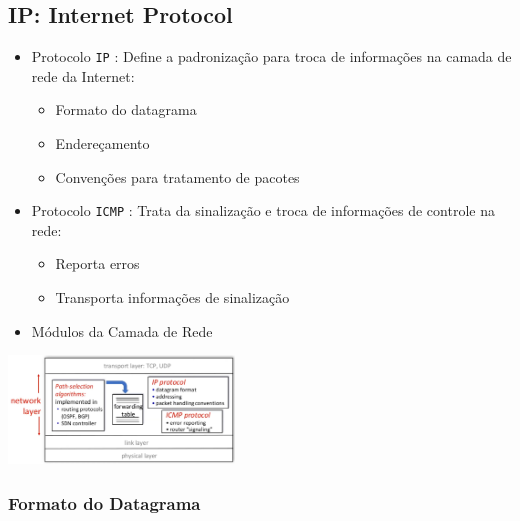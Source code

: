     \subsection{IP: Internet Protocol}
    
        \begin{itemize}[left=0.5cm, align=left, nosep]
            \item Protocolo \texttt{IP} : Define a padronização para troca de informações na camada de rede da Internet:
            \begin{itemize}[left=0.5cm, nosep, label=$\hookrightarrow$]
                \item Formato do datagrama
                \item Endereçamento
                \item Convenções para tratamento de pacotes
            \end{itemize}
            \item Protocolo \texttt{ICMP} : Trata da sinalização e troca de informações de controle na rede:
            \begin{itemize}[left=0.5cm, nosep, label=$\hookrightarrow$]
                \item Reporta erros
                \item Transporta informações de sinalização
            \end{itemize}
        \end{itemize}


        \begin{itemize}[left=0.5cm, align=left, nosep]
            \item Módulos da Camada de Rede
        \end{itemize}

        \begin{center}
            \includegraphics[width=0.45\textwidth]{img/cap-04/modulos-camada-de-rede.png}
        \end{center}

        \subsubsection*{Formato do Datagrama}

